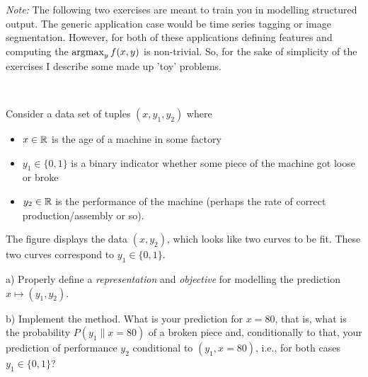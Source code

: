 

\renewcommand{\course}{Machine Learning}
\renewcommand{\exnum}{5}


\exercises



\emph{Note:} The following two exercises are meant to train you in
modelling structured output. The generic application case would be
time series tagging or image segmentation. However, for both of these
applications defining features and computing the $\operatorname*{argmax}_y f(x,y)$ is
non-trivial. So, for the sake of simplicity of the exercises I
describe some made up 'toy' problems.

~

\begin{figure}
\end{figure}

Consider a data set of tuples $(x,y_1,y_2)$ where
\begin{itemize}
\item $x\in{\mathbb{R}}$ is the age of a machine in some factory
\item $y_1\in\{0,1\}$ is a binary indicator whether some piece of the
  machine got loose or broke
\item $y_2\in{\mathbb{R}}$ is the performance of the machine (perhaps the
  rate of correct production/assembly or so).
\end{itemize}
The figure displays the data $(x,y_2)$, which looks like two curves to
be fit. These two curves correspond to $y_1\in\{0,1\}$.

a) Properly define a \emph{representation} and \emph{objective} for
modelling the prediction $x \mapsto (y_1, y_2)$.

b) Implement the method. What is your prediction for $x=80$, that is,
what is the probability $P(y_1 \| x=80)$ of a broken piece and,
conditionally to that, your prediction of performance $y_2$
conditional to $(y_1, x=80)$, i.e., for both cases $y_1\in\{0,1\}$?

